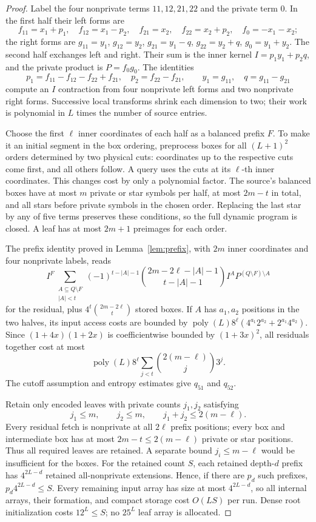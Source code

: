 \documentclass[11pt]{article}
\begin{document}
\begin{proof}
Label the four nonprivate terms $11,12,21,22$ and the private term $0$.
In the first half their left forms are
\[
f_{11}=x_1+p_1,\quad f_{12}=x_1-p_2,\quad f_{21}=x_2,\quad
f_{22}=x_2+p_2,\quad f_0=-x_1-x_2;
\]
the right forms are $g_{11}=y_1$, $g_{12}=y_2$,
$g_{21}=y_1-q$, $g_{22}=y_2+q$, $g_0=y_1+y_2$.
The second half exchanges left and right. Their sum is the inner kernel
$I=p_1y_1+p_2q$, and the private product is $P=f_0g_0$.
The identities
\[
p_1=f_{11}-f_{12}-f_{22}+f_{21},\quad p_2=f_{22}-f_{21},
\qquad y_1=g_{11},\quad q=g_{11}-g_{21}
\]
compute an $I$ contraction from four nonprivate left forms and two
nonprivate right forms. Successive local transforms shrink each dimension
to two; their work is polynomial in $L$ times the number of source entries.

Choose the first $\ell$ inner coordinates of each half as a balanced
prefix $F$. To make it an initial segment in the box ordering, preprocess
boxes for all $(L+1)^2$ orders determined by two physical cuts: coordinates
up to the respective cuts come first, and all others follow. A query uses
the cuts at its $\ell$-th inner coordinates. This changes cost by only a
polynomial factor. The source's balanced boxes have at most $m$ private
or star symbols per half, at most $2m-t$ in total, and all stars before
private symbols in the chosen order. Replacing the last star by any of
five terms preserves these conditions, so the full dynamic program is
closed. A leaf has at most $2m+1$ preimages for each order.

The prefix identity proved in Lemma~\ref{lem:prefix}, with $2m$ inner
coordinates and four nonprivate labels, reads
\[
I^F\sum_{\substack{A\subseteq Q\setminus F\\|A|<t}}
(-1)^{t-|A|-1}\binom{2m-2\ell-|A|-1}{t-|A|-1}
I^A P^{(Q\setminus F)\setminus A}
\]
for the residual, plus $4^t\binom{2m-2\ell}{t}$ stored boxes.
If $A$ has $a_1,a_2$ positions in the two halves, its input access costs
are bounded by $\operatorname{poly}(L)8^\ell
(4^{a_1}2^{a_2}+2^{a_1}4^{a_2})$.
Since $(1+4x)(1+2x)$ is coefficientwise bounded by $(1+3x)^2$,
all residuals together cost at most
\[
\operatorname{poly}(L)8^\ell
\sum_{j<t}\binom{2(m-\ell)}j3^j.
\]
The cutoff assumption and entropy estimates give $q_{51}$ and $q_{52}$.

Retain only encoded leaves with private counts $j_1,j_2$ satisfying
\[
j_1\le m,\qquad j_2\le m,\qquad j_1+j_2\le2(m-\ell).
\]
Every residual fetch is nonprivate at all $2\ell$ prefix positions;
every box and intermediate box has at most $2m-t\le2(m-\ell)$
private or star positions. Thus all required leaves are retained. A
separate bound $j_i\le m-\ell$ would be insufficient for the boxes.
For the retained count $S$, each retained depth-$d$ prefix has
$4^{2L-d}$ retained all-nonprivate extensions. Hence, if there are $p_d$
such prefixes, $p_d4^{2L-d}\le S$. Every remaining input array has size
at most $4^{2L-d}$, so all internal arrays, their formation, and compact
storage cost $O(LS)$ per run. Dense root initialization costs $12^L\le S$;
no $25^L$ leaf array is allocated.


\end{proof}
\end{document}
